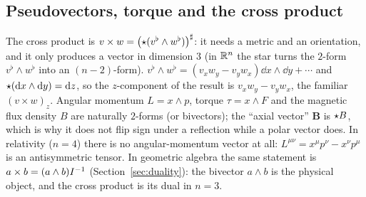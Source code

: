 \subsection{Pseudovectors, torque and the cross product}\label{sec:phys-cross}

The cross product is $v\times w=\bigl(\star(v^\flat\wedge w^\flat)\bigr)^\sharp$: it needs a metric and an orientation, and it only produces a vector in dimension $3$ (in $\mathbb{R}^n$ the star turns the $2$-form $v^\flat\wedge w^\flat$ into an $(n-2)$-form).
\numcheck $v^\flat\wedge w^\flat=(v_xw_y-v_yw_x)\dd x\wedge\dd y+\cdots$ and $\star(\mathrm{d} x\wedge\mathrm{d} y)=\mathrm{d} z$, so the $z$-component of the result is $v_xw_y-v_yw_x$, the familiar $(v\times w)_z$.
Angular momentum $L=x\wedge p$, torque $\tau=x\wedge F$ and the magnetic flux density $B$ are naturally $2$-forms (or bivectors); the ``axial vector'' $\mathbf B$ is $\star B$, which is why it does not flip sign under a reflection while a polar vector does. In relativity ($n=4$) there is no angular-momentum vector at all: $L^{\mu\nu}=x^\mu p^\nu-x^\nu p^\mu$ is an antisymmetric tensor.
In geometric algebra the same statement is $a\times b=(a\wedge b)I^{-1}$ (Section~\ref{sec:duality}): the bivector $a\wedge b$ is the physical object, and the cross product is its dual in $n=3$.

